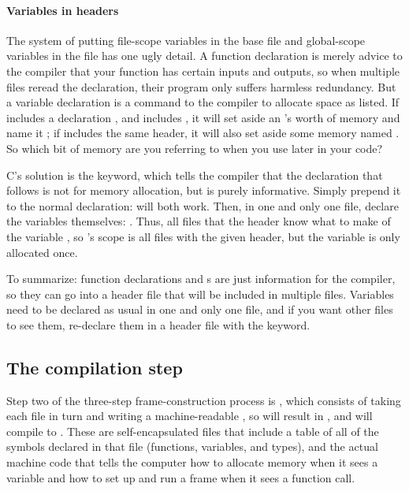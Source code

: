 \paragraph{\treesymbol Variables in headers} \label{extern} The system of
putting file-scope variables in the base  file and global-scope
variables in the  file has one ugly detail. A
function declaration is merely advice to the compiler that your function
has certain inputs and outputs, so when multiple files reread the
declaration, their program only suffers harmless redundancy. But a
variable declaration is a command to the compiler to allocate space as
listed. If  includes a declaration , and
 includes , it will set aside an
's worth of memory and name it ; if 
includes the same header, it will also set aside some memory
named . So which bit of memory are you referring to when you use
 later in your code? 

C's solution is the  keyword, which tells the compiler that
the declaration that follows is not for memory allocation, but is purely
informative. Simply prepend it to the normal declaration:  will both work. Then, in one and only one
 file, declare the variables themselves: . Thus, all files that  the header know what to make of
the variable , so 's scope is all files with the given
header, but the variable is only allocated once.

To summarize: function declarations and s are just information
for the compiler, so they can go into a header file that will be included
in multiple  files. Variables need to be declared as usual in
one and only one  file, and if you want other  files to
see them, re-declare them in a header file with the  keyword.

\subsection{The compilation step} 
Step two of the three-step frame-construction process is ,
which consists of taking each  file in turn and
writing a machine-readable , so  will
result in , and  will compile to
. These  are self-encapsulated
files that include a table of all of the symbols declared in that file
(functions, variables, and types), and 
the actual machine code that tells the computer how to allocate memory
when it sees a variable and how to set up and run a frame when it sees a
function call.

